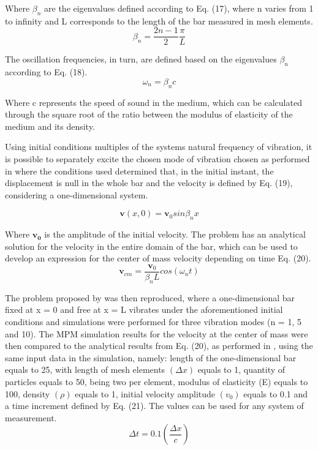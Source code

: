 \documentclass[preprint,12pt]{elsarticle}
\begin{document}
Where $\beta _n$ are the eigenvalues defined according to Eq. (17), where n varies from 1 to infinity and L corresponds to the length of the bar measured in mesh elements.
\begin{equation}
\beta_n = \frac{2n-1}{2}\frac{\pi}{L}    
\end{equation}

The oscillation frequencies, in turn, are defined based on the eigenvalues $\beta_n$ according to Eq. (18).
\begin{equation}
    \omega_n = \beta_nc
\end{equation}

Where c represents the speed of sound in the medium, which can be calculated through the square root of the ratio between the modulus of elasticity of the medium and its density.

Using initial conditions multiples of the systems natural frequency of vibration, it is possible to separately excite the chosen mode of vibration chosen as performed in \cite{Bardenhagen2002} where the conditions used determined that, in the initial instant, the displacement is null in the whole bar and the velocity is defined by Eq. (19), considering a one-dimensional system.

\begin{equation}
    \boldsymbol{v}(x,0)=\boldsymbol{v}_0sin\beta_nx
\end{equation}

Where $\boldsymbol{v_0}$ is the amplitude of the initial velocity.
The problem has an analytical solution for the velocity in the entire domain of the bar, which can be used to develop an expression for the center of mass velocity depending on time Eq. (20).
\begin{equation}
    \boldsymbol{v}_{cm}=\frac{\boldsymbol{v}_0}{\beta_nL}cos(\omega_nt)
\end{equation}

The problem proposed by \cite{Bardenhagen2002} was then reproduced, where a one-dimensional bar fixed at x = 0 and free at x = L vibrates under the aforementioned initial conditions and simulations were performed for three vibration modes (n = 1, 5 and 10). The MPM simulation results for the velocity at the center of mass were then compared to the analytical results from Eq. (20), as performed in \cite{Bardenhagen2002}, using the same input data in the simulation, namely: length of the one-dimensional bar equals to 25, with length of mesh elements $(\Delta x)$ equals to 1, quantity of particles equals to 50, being two per element, modulus of elasticity (E) equals to 100, density $(\rho)$ equals to 1, initial velocity amplitude $(v_0)$ equals to 0.1 and a time increment defined by Eq. (21). The values can be used for any system of measurement.
\begin{equation}
    \Delta t = 0.1\left (\frac{\Delta x}{c}  \right )
\end{equation}
\end{document}
